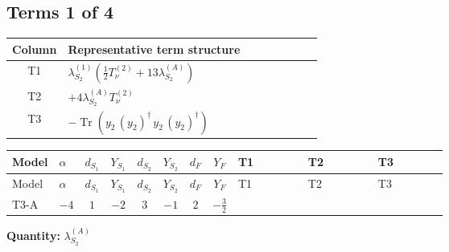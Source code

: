 \documentclass[8pt]{article}
\begin{document}
\begin{landscape}
\subsection*{Terms 1 of 4}
\begin{center}
\begin{tabular}{@{}c >{\raggedright\arraybackslash}p{0.82\linewidth}@{}}
\toprule
Column & Representative term structure \\
\midrule
T1 & \(\displaystyle {\lambda_{S_2}^{(1)}} \left(\frac{1}{2} T_{\nu}^{(2)}+13 {\lambda_{S_2}^{(A)}}\right)\) \\
\midrule
T2 & \(\displaystyle +4 {\lambda_{S_2}^{(A)}} T_{\nu}^{(2)}\) \\
\midrule
T3 & \(\displaystyle -\operatorname{Tr}\!\left({y_2}\,\left({y_2}\right)^{\dagger}\,{y_2}\,\left({y_2}\right)^{\dagger}\right)\) \\
\midrule
\bottomrule
\end{tabular}
\end{center}
\smallskip
\tiny
\begin{longtable}{@{}llcccccc >{\raggedright\arraybackslash}p{0.21\linewidth} >{\raggedright\arraybackslash}p{0.21\linewidth} >{\raggedright\arraybackslash}p{0.21\linewidth}@{}}
\toprule
Model & $\alpha$ & $d_{S_1}$ & $Y_{S_1}$ & $d_{S_2}$ & $Y_{S_2}$ & $d_F$ & $Y_F$ & T1 & T2 & T3 \\
\midrule
\endfirsthead
\toprule
Model & $\alpha$ & $d_{S_1}$ & $Y_{S_1}$ & $d_{S_2}$ & $Y_{S_2}$ & $d_F$ & $Y_F$ & T1 & T2 & T3 \\
\midrule
\endhead
T3-A & $-4$ & $1$ & $-2$ & $3$ & $-1$ & $2$ & $-\frac{3}{2}$ & \scriptsize\adjustbox{max width=\linewidth}{$\begin{gathered} {\lambda_{S_2}^{(1)}} \left(\frac{1}{2} T_{\nu}^{(2)}+13 {\lambda_{S_2}^{(A)}}\right)\end{gathered}$} & \scriptsize\adjustbox{max width=\linewidth}{$\begin{gathered} +4 {\lambda_{S_2}^{(A)}} T_{\nu}^{(2)}\end{gathered}$} & \scriptsize\adjustbox{max width=\linewidth}{$\begin{gathered} -\operatorname{Tr}\!\left({y_2}\,\left({y_2}\right)^{\dagger}\,{y_2}\,\left({y_2}\right)^{\dagger}\right)\end{gathered}$} \\
\midrule
\bottomrule
\end{longtable}
\clearpage
\noindent\textbf{Quantity: }$\lambda_{S_2}^{(A)}$\par\smallskip

\end{landscape}
\end{document}
